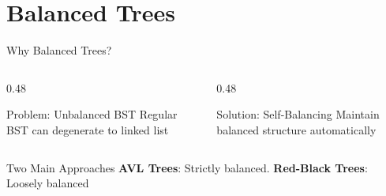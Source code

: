 \documentclass[aspectratio=169,xcolor=dvipsnames]{beamer}
\begin{document}
\section{Balanced Trees}

\begin{frame}{Why Balanced Trees?}
  \begin{columns}
    \begin{column}{0.48\textwidth}
      \begin{alertblock}{Problem: Unbalanced BST}
        Regular BST can degenerate to linked list

        \vspace{0.2cm}

      \end{alertblock}
    \end{column}
    \begin{column}{0.48\textwidth}
      \begin{block}{Solution: Self-Balancing}
        Maintain balanced structure automatically

        \vspace{0.2cm}

      \end{block}
    \end{column}
  \end{columns}

  \vspace{0.3cm}

  \begin{exampleblock}{Two Main Approaches}
    \textbf{AVL Trees}: Strictly balanced. \textbf{Red-Black Trees}: Loosely balanced
  \end{exampleblock}
\end{frame}
\end{document}
